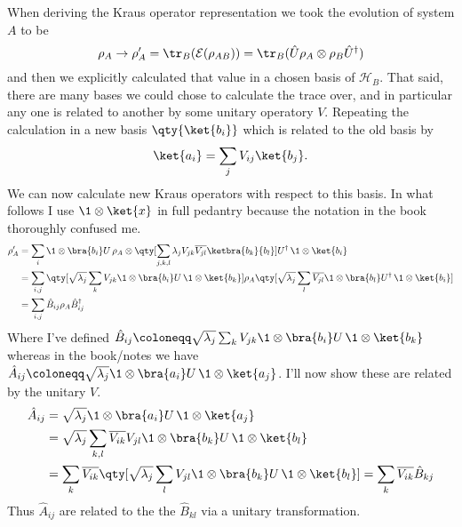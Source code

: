 \documentclass[
	pages,
	boxes,
	color=RoyalPurple
]{homework}
\makeatletter
\numberwithin{tcb@cnt@prob}{section}
\makeatother
\begin{document}
\begin{solution}
    When deriving the Kraus operator representation we took the evolution of system $A$ to be
    \begin{equation*}
        \rho_A\to\rho_A' = \tr_B(\mathcal{E}(\rho_{AB})) = \tr_B(\hat{U}\rho_A\otimes\rho_B\hat{U}^\dagger)
    \end{equation*}
    and then we explicitly calculated that value in a chosen basis of $\mathcal{H}_B$. That said, there are many bases we could chose to calculate the trace over, and in particular any one is related to another by some unitary operatory $V$. Repeating the calculation in a new basis $\qty{\ket{b_i}}$ which is related to the old basis by
    \begin{equation*}
        \ket{a_i} = \sum_j V_{ij}\ket{b_j}.
    \end{equation*}
    We can now calculate new Kraus operators with respect to this basis. In what follows I use $\1\otimes\ket{x}$ in full pedantry because the notation in the book thoroughly confused me.
    \begin{align*}
        \rho_A' & = \sum_i \1\otimes\bra{b_i}U\,\rho_A\otimes\qty[\sum_{j,k,l}\lambda_j V_{jk}\overline{V_{jl}}\ketbra{b_k}{b_l}]U^\dagger \, \1\otimes \ket{b_i}                                              \\
                & = \sum_{i,j}\qty[\sqrt{\lambda_j}\sum_k V_{jk}\1\otimes\bra{b_i}U\, \1\otimes\ket{b_k}]\rho_A\qty[\sqrt{\lambda_j}\sum_{l}\overline{V_{jl}}\1\otimes\bra{b_l}U^\dagger\, \1\otimes\ket{b_i}] \\
                & = \sum_{i,j}\hat{B}_{ij}\rho_A\hat{B}_{ij}^\dagger
    \end{align*}
    Where I've defined $\hat{B}_{ij}\defeq \sqrt{\lambda_j}\sum_{k}V_{jk}\1\otimes \bra{b_i}U\,\1\otimes\ket{b_k}$ whereas in the book/notes we have $\hat{A}_{ij} \defeq\sqrt{\lambda_j}\1\otimes\bra{a_i} U \, \1\otimes\ket{a_j}$. I'll now show these are related by the unitary $V$.
    \begin{align*}
        \hat{A}_{ij} & = \sqrt{\lambda_j}\1\otimes\bra{a_i} U \, \1\otimes\ket{a_j}                                                                               \\
                     & = \sqrt{\lambda_j}\sum_{k, l}\overline{V_{ik}}V_{jl}\1\otimes\bra{b_k}U\,\1\otimes\ket{b_l}                                                \\
                     & = \sum_k\overline{V_{ik}}\qty[\sqrt{\lambda_j}\sum_l V_{jl}\1\otimes\bra{b_k}U\,\1\otimes \ket{b_l}] = \sum_k\overline{V_{ik}}\hat{B}_{kj}
    \end{align*}
    Thus $\hat{A}_{ij}$ are related to the the $\hat{B}_{kl}$ via a unitary transformation.
\end{solution}
\end{document}
